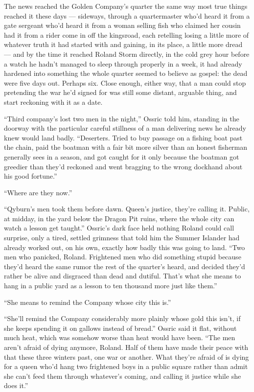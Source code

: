 The news reached the Golden Company’s quarter the same way most true things reached it these days — sideways, through a quartermaster who’d heard it from a gate sergeant who’d heard it from a woman selling fish who claimed her cousin had it from a rider come in off the kingsroad, each retelling losing a little more of whatever truth it had started with and gaining, in its place, a little more dread — and by the time it reached Roland Storm directly, in the cold grey hour before a watch he hadn’t managed to sleep through properly in a week, it had already hardened into something the whole quarter seemed to believe as gospel: the dead were five days out. Perhaps six. Close enough, either way, that a man could stop pretending the war he’d signed for was still some distant, arguable thing, and start reckoning with it as a date.

“Third company’s lost two men in the night,” Ossric told him, standing in the doorway with the particular careful stillness of a man delivering news he already knew would land badly. “Deserters. Tried to buy passage on a fishing boat past the chain, paid the boatman with a fair bit more silver than an honest fisherman generally sees in a season, and got caught for it only because the boatman got greedier than they’d reckoned and went bragging to the wrong dockhand about his good fortune.”

“Where are they now.”

“Qyburn’s men took them before dawn. Queen’s justice, they’re calling it. Public, at midday, in the yard below the Dragon Pit ruins, where the whole city can watch a lesson get taught.” Ossric’s dark face held nothing Roland could call surprise, only a tired, settled grimness that told him the Summer Islander had already worked out, on his own, exactly how badly this was going to land. “Two men who panicked, Roland. Frightened men who did something stupid because they’d heard the same rumor the rest of the quarter’s heard, and decided they’d rather be alive and disgraced than dead and dutiful. That’s what she means to hang in a public yard as a lesson to ten thousand more just like them.”

“She means to remind the Company whose city this is.”

“She’ll remind the Company considerably more plainly whose gold this isn’t, if she keeps spending it on gallows instead of bread.” Ossric said it flat, without much heat, which was somehow worse than heat would have been. “The men aren’t afraid of dying anymore, Roland. Half of them have made their peace with that these three winters past, one war or another. What they’re afraid of is dying for a queen who’d hang two frightened boys in a public square rather than admit she can’t feed them through whatever’s coming, and calling it justice while she does it.”

